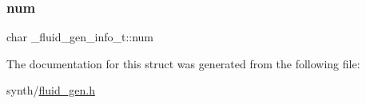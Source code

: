 \subsubsection{\texorpdfstring{num}{num}}
{\footnotesize\ttfamily char \+\_\+fluid\+\_\+gen\+\_\+info\+\_\+t\+::num}



The documentation for this struct was generated from the following file\+:\begin{DoxyCompactItemize}
\item 
synth/\hyperlink{fluid__gen_8h}{fluid\+\_\+gen.\+h}\end{DoxyCompactItemize}

